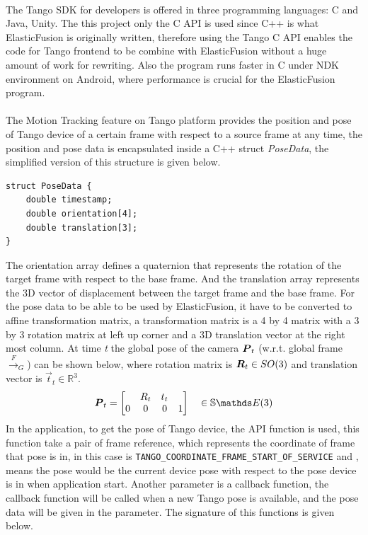 \documentclass[12pt,twoside]{article}
\begin{document}
\\
The Tango SDK for developers is offered in three programming languages: C and Java, Unity. The this project only the C API is used since C++ is what ElasticFusion is originally written, therefore using the Tango C API enables the code for Tango frontend to be combine with ElasticFusion without a huge amount of work for rewriting. Also the program runs faster in C under NDK environment on Android, where performance is crucial for the ElasticFusion program.\\
\\
The Motion Tracking feature on Tango platform provides the position and pose of Tango device of a certain frame with respect to a source frame at any time, the position and pose data is encapsulated inside a C++ struct \textit{PoseData}, the simplified version of this structure is given below.
\begin{lstlisting}
struct PoseData {
	double timestamp;
    double orientation[4];
    double translation[3];
}
\end{lstlisting}
The orientation array defines a quaternion that represents the rotation of the target frame with respect to the base frame. And the translation array represents the 3D vector of displacement between the target frame and the base frame. For the pose data to be able to be used by ElasticFusion, it have to be converted to affine transformation matrix, a transformation matrix is a 4 by 4 matrix with a 3 by 3 rotation matrix at left up corner and a 3D translation vector at the right most column. At time \textit{t} the global pose of the camera ${\boldsymbol{{P}}}_t$ (w.r.t. global frame $\xrightarrow{\textit{F}}_G$) can be shown below, where rotation matrix is ${\boldsymbol{{R}}}_t \in SO(3)$ and translation vector is $\vec t_t \in \mathbb{R}^3$.
\begin{align}
\mat P_t = \begin{bmatrix}
& R_t & t_t\\
0 & 0 & 0 & 1
\end{bmatrix} \quad  \in \mathbb{S}\E(3)
\end{align}
In the application, to get the pose of Tango device, the API function  is used, this function take a pair of frame reference, which represents the coordinate of frame that pose is in, in this case is \verb|TANGO_COORDINATE_FRAME_START_OF_SERVICE| and , means the pose would be the current device pose with respect to the pose device is in when application start. Another parameter is a callback function, the callback function will be called when a new Tango pose is available, and the pose data will be given in the parameter. The signature of this functions is given below.
\end{document}
